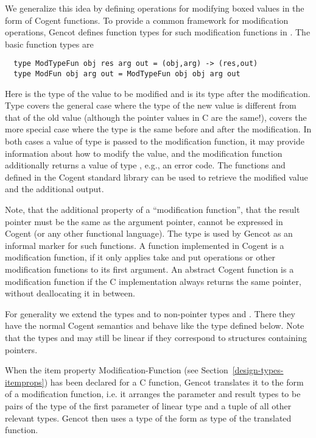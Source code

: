 We generalize this idea by defining operations for modifying boxed values in the form of Cogent functions.
To provide a common framework for modification operations, Gencot defines function types for such modification functions 
in . The basic function types are
\begin{verbatim}
  type ModTypeFun obj res arg out = (obj,arg) -> (res,out)
  type ModFun obj arg out = ModTypeFun obj obj arg out
\end{verbatim}
Here  is the type of the value to be modified and  is its type after the modification.
Type  covers the general case where the type of the new value is different from that of the old value (although the pointer
values in C are the same!),  covers the more special case where
the type is the same before and after the modification. In both cases a value of type  is passed to the modification
function, it may provide information about how to modify the value, and the modification function additionally returns a value of
type , e.g., an error code. The functions  and  defined in the Cogent standard library can be used
to retrieve the modified value and the additional output.

Note, that the additional property of a ``modification function'', that the result pointer must be the same as the argument pointer,
cannot be expressed in Cogent (or any other functional language). The type  is used by Gencot as an informal marker
for such functions. A function implemented in Cogent is a modification function, if it only applies take and put operations 
or other modification functions to its
first argument. An abstract Cogent function is a modification function
if the C implementation always returns the same pointer, without deallocating it in between.

For generality we extend the types  and  to non-pointer types  and . There
they have the normal Cogent semantics and behave like the type  defined below. Note that the types 
and  may still be linear if they correspond to structures containing pointers.

When the item property Modification-Function (see Section~\ref{design-types-itemprops}) has been declared for a C function, Gencot
translates it to the form of a modification function, i.e. it arranges the parameter and result types to be pairs of the type
of the first parameter of linear type and a tuple of all other relevant types. Gencot then uses a type of the form 
 as type of the translated function.

